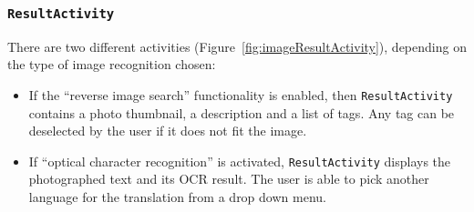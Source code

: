 \subsubsection{\texttt{ResultActivity}}
There are two different activities (Figure~\ref{fig:imageResultActivity}),
depending on the type of image recognition chosen:
\begin{itemize}
        \item If the ``reverse image search'' functionality is enabled, then
\texttt{ResultActivity} contains a photo thumbnail, a description and a list of
tags. Any tag can be deselected by the user if it does not fit the image.
    \item If ``optical character recognition'' is activated,
\texttt{ResultActivity} displays the photographed text and its OCR result.
The user is able to pick another language for the translation from a drop down menu.
\end{itemize}

